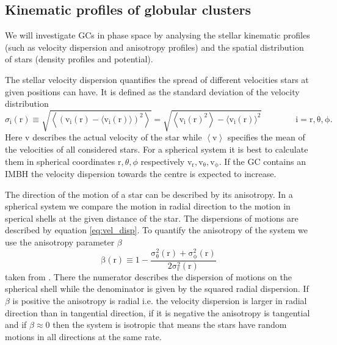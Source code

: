 \subsection{Kinematic profiles of globular clusters}\label{sec:kin_prof_theory}
We will investigate \acp{GC} in phase space by analysing the stellar kinematic profiles (such as velocity dispersion and anisotropy profiles) and the spatial distribution of stars (density profiles and potential). 
\par The stellar velocity dispersion quantifies the spread of different velocities stars at given positions can have. It is defined as the standard deviation of the velocity distribution  
\begin{equation}\label{eq:vel_disp}
\sigma_\mathrm{i}(\mathrm{r})\equiv\sqrt{\left\langle(\mathrm{v_i}(\mathrm{r})-\langle \mathrm{v_i}(\mathrm{r})\rangle)^2\right\rangle}=\sqrt{\left\langle \mathrm{v_i}(\mathrm{r})^2\right\rangle-\langle \mathrm{v_i}(\mathrm{r})\rangle^2} \qquad\qquad \mathrm{i=r,\theta,\phi}.
\end{equation} Here v describes the actual velocity of the star while \(\left\langle \mathrm{v}\right\rangle\) specifies the mean of the velocities of all considered stars. For a spherical system it is best to calculate them in spherical coordinates \(\mathrm{r},\theta,\phi\) respectively \(\mathrm{v_r,v_{\theta},v_{\phi}}\). If the \ac{GC} contains an \ac{IMBH} the velocity dispersion towards the centre is expected to increase. 
\par The direction of the motion of a star can be described by its anisotropy. In a spherical system we compare the motion in radial direction to the motion in sperical shells at the given distance of the star. The dispersions of motions are described by equation \ref{eq:vel_disp}. To quantify the anisotropy of the system we use the anisotropy parameter \(\beta\) 
\begin{equation}\label{eq:anisotropy}
\mathrm{\beta(r)\equiv1-\frac{\sigma_\theta ^2(r)+\sigma_\phi ^2(r)}{2\sigma_r ^2(r)}}
\end{equation} taken from \citet[eq. 4.61]{2008gady.book.....B}. There the numerator describes the dispersion of motions on the spherical shell while the denominator is given by the squared radial dispersion. If \(\beta\) is positive the anisotropy is radial i.e. the velocity dispersion is larger in radial direction than in tangential direction, if it is negative the anisotropy is tangential and if \(\beta\approx0\) then the system is isotropic that means the stars have random motions in all directions at the same rate. 
